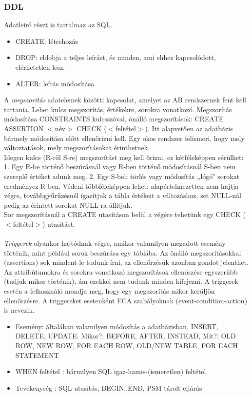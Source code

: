 \documentclass[margin=0px]{article}
\begin{document}
	\subsubsection{DDL}
	
	Adatleíró részt is tartalmaz az SQL.
	\begin{itemize}
		\item CREATE: létrehozás
		\item DROP: eldobja a teljes leírást, és minden, ami ehhez kapcsolódott, elérhetetlen lesz.
		\item ALTER: leírás módosítása
	\end{itemize}
	A \textit{megszorítás} adatelemek közötti kapcsolat, amelyet az AB rendszernek fent kell tartania. Lehet kulcs megszorítás, értékekre, sorokra vonatkozó. Megszorítás módosítása CONSTRAINTS kulcsszóval, önálló megszorítások: CREATE ASSERTION $<$név$>$ CHECK ($<$feltétel$>$). Itt alapvetően az adatbázis bármely módosítása előtt ellenőrizni kell. Egy okos rendszer felismeri, hogy mely változtatások, mely megszorításokat érinthetnek. \\
	Idegen kulcs (R-ről S-re) megszorítást meg kell őrizni, ez kétféleképpen sérülhet: 1. Egy R-be történő beszúrásnál vagy R-ben történő módosításnál S-ben nem szereplő értéket adunk meg. 2. Egy S-beli törlés vagy módosítás ,,lógó" sorokat eredményez R-ben. Védeni többféleképpen lehet: alapértelmezetten nem hajtja végre, továbbgyűrűzésnél igazítjuk a tábla értékeit a változáshoz, set NULL-nál pedig az érintett sorokat NULL-ra állítjuk. \\
	Sor megszorításnál a CREATE utasításon belül a végére tehetünk egy CHECK ($<$feltétel$>$) utasítást. \\ \\
	\textit{Triggerek} olyankor hajtódnak végre, amikor valamilyen megadott esemény történik, mint például sorok beszúrása egy táblába. Az önálló megszorításokkal (assertions) sok mindent le tudunk írni, az ellenőrzésük azonban gondot jelenthet. Az attribútumokra és sorokra vonatkozó megszorítások ellenőrzése egyszerűbb (tudjuk mikor történik), ám ezekkel nem tudunk minden kifejezni. A triggerek esetén a felhasználó mondja meg, hogy egy megszorítás mikor kerüljön ellenőrzésre. A triggereket esetenként ECA szabályoknak (event-condition-action) is nevezik.
	\begin{itemize}
		\item Esemény: általában valamilyen módosítás a adatbázisban, INSERT, DELETE, UPDATE. Mikor?: BEFORE, AFTER, INSTEAD, Mit?: OLD ROW, NEW ROW, FOR EACH ROW, OLD/NEW TABLE, FOR EACH STATEMENT
		\item WHEN feltétel : bármilyen SQL igaz-hamis-(ismeretlen) feltétel.
		\item Tevékenység : SQL utasítás, BEGIN..END, PSM tárolt eljárás
	\end{itemize}
\end{document}

